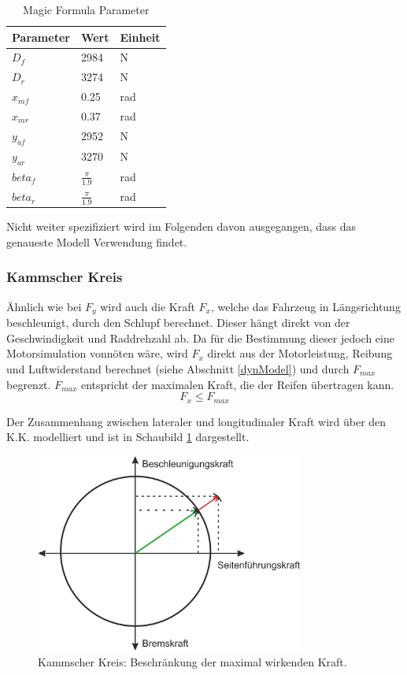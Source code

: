 \documentclass{like}
\begin{document}
\begin{table}[]
	\centering
	\caption{Magic Formula Parameter}
	\begin{tabular}{l|l|l}
		\hline
		Parameter	&  Wert  & Einheit \\ \hline
		\(D_f\)		&  2984 & N \\
		\(D_r\)		&  3274 & N \\
		\(x_{mf}\)	&  0.25 & rad \\
		\(x_{mr}\)	&  0.37 & rad \\
		\(y_{af}\)	&  2952 & N \\
 		\(y_{ar}\)	&  3270 & N \\
		\(beta_{f}\)	&  $\frac{\pi}{1.9}$ & rad \\
		\(beta_{r}\)	&  $\frac{\pi}{1.9}$ & rad \\
		
	\end{tabular}
	
	\label{tireParam}
\end{table}

Nicht weiter spezifiziert wird im Folgenden davon ausgegangen, dass das genaueste Modell Verwendung findet.



\subsubsection*{Kammscher Kreis}

Ähnlich wie bei \(F_y\) wird auch die Kraft \(F_x\), welche das Fahrzeug in Längsrichtung beschleunigt, durch den Schlupf berechnet. Dieser hängt direkt von der Geschwindigkeit und Raddrehzahl ab. Da für die Bestimmung dieser jedoch eine Motorsimulation vonnöten wäre, wird \(F_x\) direkt aus der Motorleistung, Reibung und Luftwiderstand berechnet (siehe Abschnitt \ref{dynModel}) und durch \(F_{max}\) begrenzt. \(F_{max}\) entspricht der maximalen Kraft, die der Reifen übertragen kann.\\
\begin{equation}
F_x \leq F_{max}
\end{equation}

Der Zusammenhang zwischen lateraler und longitudinaler Kraft wird über den \ac{K.K.} modelliert und ist in Schaubild \ref{fig:kamKreis} dargestellt. 

\begin{figure}[ht!]
	\centering
	\includegraphics[width=250pt]{Abbildungen/kamKreis.png}
	\caption{Kammscher Kreis: Beschränkung der maximal wirkenden Kraft.}
	\label{fig:kamKreis}
\end{figure}
\end{document}
